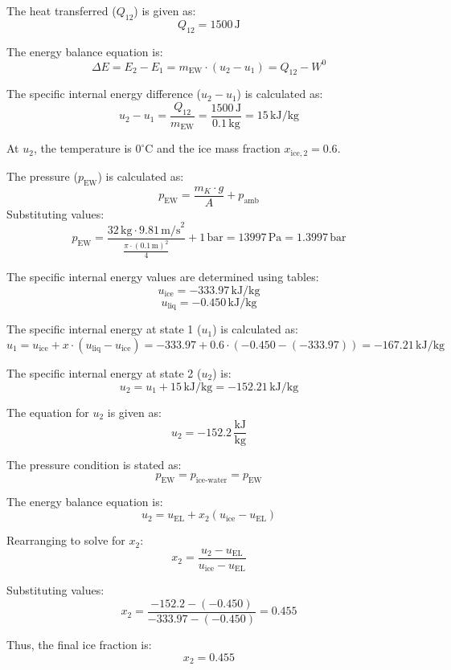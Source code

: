 The heat transferred (\( Q_{12} \)) is given as:  
\[
Q_{12} = 1500 \, \text{J}
\]  

The energy balance equation is:  
\[
\Delta E = E_2 - E_1 = m_{\text{EW}} \cdot (u_2 - u_1) = Q_{12} - W^0
\]  

The specific internal energy difference (\( u_2 - u_1 \)) is calculated as:  
\[
u_2 - u_1 = \frac{Q_{12}}{m_{\text{EW}}} = \frac{1500 \, \text{J}}{0.1 \, \text{kg}} = 15 \, \text{kJ/kg}
\]  

At \( u_2 \), the temperature is \( 0^\circ\text{C} \) and the ice mass fraction \( x_{\text{ice},2} = 0.6 \).  

The pressure (\( p_{\text{EW}} \)) is calculated as:  
\[
p_{\text{EW}} = \frac{m_K \cdot g}{A} + p_{\text{amb}}
\]  
Substituting values:  
\[
p_{\text{EW}} = \frac{32 \, \text{kg} \cdot 9.81 \, \text{m/s}^2}{\frac{\pi \cdot (0.1 \, \text{m})^2}{4}} + 1 \, \text{bar} = 13997 \, \text{Pa} = 1.3997 \, \text{bar}
\]  

The specific internal energy values are determined using tables:  
\[
u_{\text{ice}} = -333.97 \, \text{kJ/kg}
\]  
\[
u_{\text{liq}} = -0.450 \, \text{kJ/kg}
\]  

The specific internal energy at state 1 (\( u_1 \)) is calculated as:  
\[
u_1 = u_{\text{ice}} + x \cdot (u_{\text{liq}} - u_{\text{ice}}) = -333.97 + 0.6 \cdot (-0.450 - (-333.97)) = -167.21 \, \text{kJ/kg}
\]  

The specific internal energy at state 2 (\( u_2 \)) is:  
\[
u_2 = u_1 + 15 \, \text{kJ/kg} = -152.21 \, \text{kJ/kg}
\]

The equation for \( u_2 \) is given as:  
\[
u_2 = -152.2 \, \frac{\text{kJ}}{\text{kg}}
\]  

The pressure condition is stated as:  
\[
p_{\text{EW}} = p_{\text{ice-water}} = p_{\text{EW}}
\]  

The energy balance equation is:  
\[
u_2 = u_{\text{EL}} + x_2 (u_{\text{ice}} - u_{\text{EL}})
\]  

Rearranging to solve for \( x_2 \):  
\[
x_2 = \frac{u_2 - u_{\text{EL}}}{u_{\text{ice}} - u_{\text{EL}}}
\]  

Substituting values:  
\[
x_2 = \frac{-152.2 - (-0.450)}{-333.97 - (-0.450)} = 0.455
\]  

Thus, the final ice fraction is:  
\[
x_2 = 0.455
\]